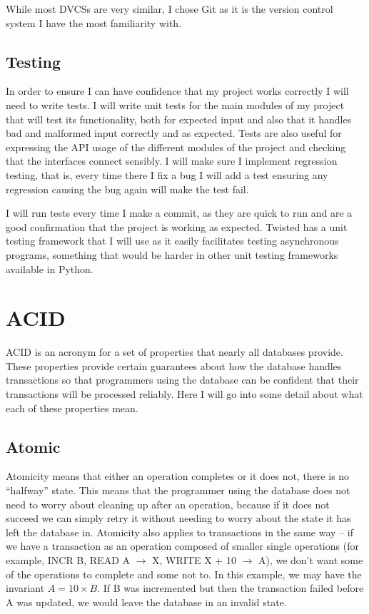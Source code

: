 \documentclass[12pt,twoside,notitlepage]{report}
\begin{document}
While most DVCSs are very similar, I chose Git as it is the version control system I have the most
familiarity with.

\subsection{Testing}

In order to ensure I can have confidence that my project works correctly I will need to write
tests. I will write unit tests for the main modules of my project that will test its
functionality, both for expected input and also that it handles bad and malformed input correctly
and as expected. Tests are also useful for expressing the API usage of the different modules of
the project and checking that the interfaces connect sensibly. I will make sure I implement
regression testing, that is, every time there I fix a bug I will add a test ensuring any
regression causing the bug again will make the test fail.

I will run tests every time I make a commit, as they are quick to run and are a good confirmation
that the project is working as expected. Twisted has a unit testing framework that I will use as
it easily facilitates testing asynchronous programs, something that would be harder in other unit
testing frameworks available in Python.

\section{ACID}

ACID is an acronym for a set of properties that nearly all databases provide. These properties
provide certain guarantees about how the database handles transactions so that programmers using
the database can be confident that their transactions will be processed reliably. Here I will go
into some detail about what each of these properties mean.

\subsection*{Atomic}

Atomicity means that either an operation completes or it does not, there is no ``halfway'' state.
This means that the programmer using the database does not need to worry about cleaning up after
an operation, because if it does not succeed we can simply retry it without needing to worry about
the state it has left the database in. Atomicity also applies to transactions in the same way --
if we have a transaction as an operation composed of smaller single operations (for example, INCR
B, READ A $\rightarrow$ X, WRITE X + 10 $\rightarrow$ A), we don't want some of the operations to
complete and some not to. In this example, we may have the invariant $A = 10\times B$. If B was
incremented but then the transaction failed before A was updated, we would leave the database in
an invalid state.
\end{document}
